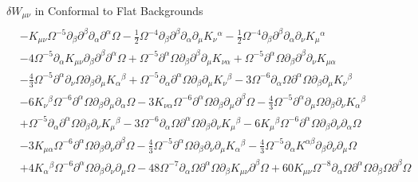 \documentclass[8pt,aspectratio=1610]{beamer}
\begin{document}
\begin{frame}{$\delta W_{\mu\nu}$ in Conformal to Flat Backgrounds}
{\begin{align}
		\nonumber\\
		& -  K_{\mu \nu} \Omega^{-5} \partial_{\beta}\partial^{\beta}\partial_{\alpha}\partial^{\alpha}\Omega -  \tfrac{1}{2} \Omega^{-4} \partial_{\beta}\partial^{\beta}\partial_{\alpha}\partial_{\mu}K_{\nu}{}^{\alpha} -  \tfrac{1}{2} \Omega^{-4} \partial_{\beta}\partial^{\beta}\partial_{\alpha}\partial_{\nu}K_{\mu}{}^{\alpha} 
		\nonumber\\
		&- 4 \Omega^{-5} \partial_{\alpha}K_{\mu \nu} \partial_{\beta}\partial^{\beta}\partial^{\alpha}\Omega + \Omega^{-5} \partial^{\alpha}\Omega \partial_{\beta}\partial^{\beta}\partial_{\mu}K_{\nu \alpha} + \Omega^{-5} \partial^{\alpha}\Omega \partial_{\beta}\partial^{\beta}\partial_{\nu}K_{\mu \alpha} 
		\nonumber\\
		&-  \tfrac{4}{3} \Omega^{-5} \partial^{\alpha}\partial_{\nu}\Omega \partial_{\beta}\partial_{\mu}K_{\alpha}{}^{\beta} + \Omega^{-5} \partial_{\alpha}\partial^{\alpha}\Omega \partial_{\beta}\partial_{\mu}K_{\nu}{}^{\beta} - 3 \Omega^{-6} \partial_{\alpha}\Omega \partial^{\alpha}\Omega \partial_{\beta}\partial_{\mu}K_{\nu}{}^{\beta} 
		\nonumber\\
		&- 6 K_{\nu}{}^{\beta} \Omega^{-6} \partial^{\alpha}\Omega \partial_{\beta}\partial_{\mu}\partial_{\alpha}\Omega - 3 K_{\nu \alpha} \Omega^{-6} \partial^{\alpha}\Omega \partial_{\beta}\partial_{\mu}\partial^{\beta}\Omega -  \tfrac{4}{3} \Omega^{-5} \partial^{\alpha}\partial_{\mu}\Omega \partial_{\beta}\partial_{\nu}K_{\alpha}{}^{\beta}
		\nonumber\\
		& + \Omega^{-5} \partial_{\alpha}\partial^{\alpha}\Omega \partial_{\beta}\partial_{\nu}K_{\mu}{}^{\beta} - 3 \Omega^{-6} \partial_{\alpha}\Omega \partial^{\alpha}\Omega \partial_{\beta}\partial_{\nu}K_{\mu}{}^{\beta} - 6 K_{\mu}{}^{\beta} \Omega^{-6} \partial^{\alpha}\Omega \partial_{\beta}\partial_{\nu}\partial_{\alpha}\Omega 
		\nonumber\\
		&- 3 K_{\mu \alpha} \Omega^{-6} \partial^{\alpha}\Omega \partial_{\beta}\partial_{\nu}\partial^{\beta}\Omega -  \tfrac{4}{3} \Omega^{-5} \partial^{\alpha}\Omega \partial_{\beta}\partial_{\nu}\partial_{\mu}K_{\alpha}{}^{\beta} -  \tfrac{4}{3} \Omega^{-5} \partial_{\alpha}K^{\alpha \beta} \partial_{\beta}\partial_{\nu}\partial_{\mu}\Omega 
		\nonumber\\
		&+ 4 K_{\alpha}{}^{\beta} \Omega^{-6} \partial^{\alpha}\Omega \partial_{\beta}\partial_{\nu}\partial_{\mu}\Omega - 48 \Omega^{-7} \partial_{\alpha}\Omega \partial^{\alpha}\Omega \partial_{\beta}K_{\mu \nu} \partial^{\beta}\Omega + 60 K_{\mu \nu} \Omega^{-8} \partial_{\alpha}\Omega \partial^{\alpha}\Omega \partial_{\beta}\Omega \partial^{\beta}\Omega

\end{align}}
\end{frame}
\end{document}
